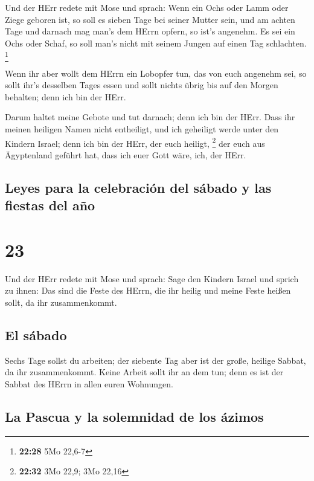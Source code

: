  Und der HErr redete mit Mose und sprach: 
Wenn ein Ochs oder Lamm oder Ziege geboren ist, so soll es sieben Tage
bei seiner Mutter sein, und am achten Tage und darnach mag man's dem
HErrn opfern, so ist's angenehm.  Es sei ein Ochs oder
Schaf, so soll man's nicht mit seinem Jungen auf einen Tag schlachten.
\footnote{\textbf{22:28} 5Mo 22,6-7}

 Wenn ihr aber wollt dem HErrn ein Lobopfer tun, das von
euch angenehm sei,  so sollt ihr's desselben Tages essen
und sollt nichts übrig bis auf den Morgen behalten; denn ich bin der
HErr.

 Darum haltet meine Gebote und tut darnach; denn ich bin
der HErr.  Dass ihr meinen heiligen Namen nicht
entheiligt, und ich geheiligt werde unter den Kindern Israel; denn ich
bin der HErr, der euch heiligt, \footnote{\textbf{22:32} 3Mo 22,9; 3Mo
  22,16}  der euch aus Ägyptenland geführt hat, dass ich
euer Gott wäre, ich, der HErr.

\hypertarget{leyes-para-la-celebraciuxf3n-del-suxe1bado-y-las-fiestas-del-auxf1o}{%
\subsection{Leyes para la celebración del sábado y las fiestas del
año}\label{leyes-para-la-celebraciuxf3n-del-suxe1bado-y-las-fiestas-del-auxf1o}}

\hypertarget{section-22}{%
\section{23}\label{section-22}}

 Und der HErr redete mit Mose und sprach: 
Sage den Kindern Israel und sprich zu ihnen: Das sind die Feste des
HErrn, die ihr heilig und meine Feste heißen sollt, da ihr
zusammenkommt.

\hypertarget{el-suxe1bado}{%
\subsection{El sábado}\label{el-suxe1bado}}

 Sechs Tage sollst du arbeiten; der siebente Tag aber ist
der große, heilige Sabbat, da ihr zusammenkommt. Keine Arbeit sollt ihr
an dem tun; denn es ist der Sabbat des HErrn in allen euren Wohnungen.

\hypertarget{la-pascua-y-la-solemnidad-de-los-uxe1zimos}{%
\subsection{La Pascua y la solemnidad de los
ázimos}\label{la-pascua-y-la-solemnidad-de-los-uxe1zimos}}

